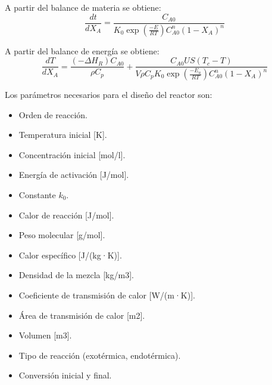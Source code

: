 	A partir del balance de materia se obtiene:
	\begin{equation*}
	\frac{dt}{dX_A} = \frac{C_{A0}}{K_0 \exp\left(\frac{-E}{RT}\right) C_{A0}^n (1-X_A)^n}
	\end{equation*}
	
	A partir del balance de energía se obtiene:
	\begin{equation*}
	\frac{dT}{dX_A} = \frac{(-\Delta H_R)C_{A0}}{\rho C_p} + \frac{C_{A0}US(T_c-T)}{V\rho C_p K_0 \exp\left(\frac{-E_a}{RT}\right)C_{A0}^n(1-X_A)^n}
	\end{equation*}
	
	Los parámetros necesarios para el diseño del reactor son:
	
	\begin{itemize}
		\item Orden de reacción.
		\item Temperatura inicial [K].
		\item Concentración inicial [mol/l].
		\item Energía de activación [J/mol].
		\item Constante $k_0$.
		\item Calor de reacción [J/mol].
		\item Peso molecular [g/mol].
		\item Calor específico [J/(kg·K)].
		\item Densidad de la mezcla [kg/m3].
		\item Coeficiente de transmisión de calor [W/(m·K)].
		\item Área de transmisión de calor [m2].
		\item Volumen [m3]. 
		\item Tipo de reacción (exotérmica, endotérmica).
		\item Conversión inicial y final.
	\end{itemize}
	
